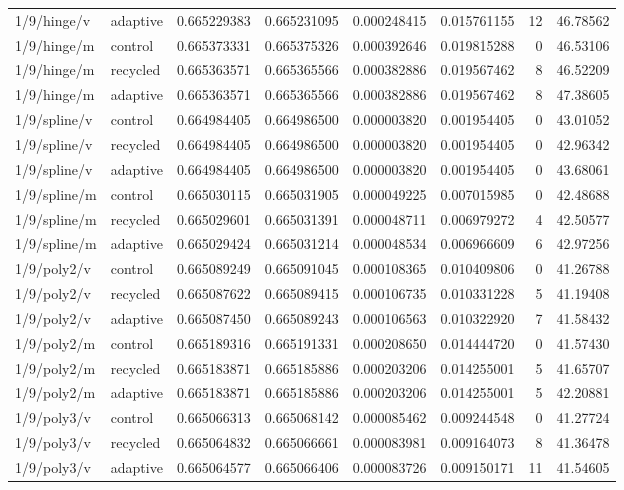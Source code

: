 \begin{longtable}{llrrrrrr}
1/9/hinge/v & adaptive & 0.665229383 & 0.665231095 & 0.000248415 & 0.015761155 & 12 & 46.78562 \\
1/9/hinge/m & control & 0.665373331 & 0.665375326 & 0.000392646 & 0.019815288 & 0 & 46.53106 \\
1/9/hinge/m & recycled & 0.665363571 & 0.665365566 & 0.000382886 & 0.019567462 & 8 & 46.52209 \\
1/9/hinge/m & adaptive & 0.665363571 & 0.665365566 & 0.000382886 & 0.019567462 & 8 & 47.38605 \\
1/9/spline/v & control & 0.664984405 & 0.664986500 & 0.000003820 & 0.001954405 & 0 & 43.01052 \\
1/9/spline/v & recycled & 0.664984405 & 0.664986500 & 0.000003820 & 0.001954405 & 0 & 42.96342 \\
1/9/spline/v & adaptive & 0.664984405 & 0.664986500 & 0.000003820 & 0.001954405 & 0 & 43.68061 \\
1/9/spline/m & control & 0.665030115 & 0.665031905 & 0.000049225 & 0.007015985 & 0 & 42.48688 \\
1/9/spline/m & recycled & 0.665029601 & 0.665031391 & 0.000048711 & 0.006979272 & 4 & 42.50577 \\
1/9/spline/m & adaptive & 0.665029424 & 0.665031214 & 0.000048534 & 0.006966609 & 6 & 42.97256 \\
1/9/poly2/v & control & 0.665089249 & 0.665091045 & 0.000108365 & 0.010409806 & 0 & 41.26788 \\
1/9/poly2/v & recycled & 0.665087622 & 0.665089415 & 0.000106735 & 0.010331228 & 5 & 41.19408 \\
1/9/poly2/v & adaptive & 0.665087450 & 0.665089243 & 0.000106563 & 0.010322920 & 7 & 41.58432 \\
1/9/poly2/m & control & 0.665189316 & 0.665191331 & 0.000208650 & 0.014444720 & 0 & 41.57430 \\
1/9/poly2/m & recycled & 0.665183871 & 0.665185886 & 0.000203206 & 0.014255001 & 5 & 41.65707 \\
1/9/poly2/m & adaptive & 0.665183871 & 0.665185886 & 0.000203206 & 0.014255001 & 5 & 42.20881 \\
1/9/poly3/v & control & 0.665066313 & 0.665068142 & 0.000085462 & 0.009244548 & 0 & 41.27724 \\
1/9/poly3/v & recycled & 0.665064832 & 0.665066661 & 0.000083981 & 0.009164073 & 8 & 41.36478 \\
1/9/poly3/v & adaptive & 0.665064577 & 0.665066406 & 0.000083726 & 0.009150171 & 11 & 41.54605 \\

\end{longtable}
